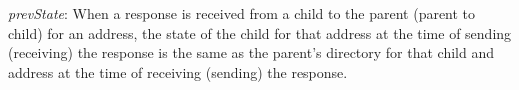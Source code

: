 \begin{inv}
\textit{prevState}: When a response is received from a child to the parent
(parent to child) for an address, the state of the child for that address at
the time of sending (receiving) the response is the same as the parent's
directory for that child and address at the time of receiving (sending) the
response.
\label{prevState}
\end{inv}



%
%
%

